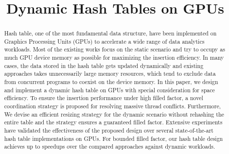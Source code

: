 \documentclass{vldb}
\begin{document}
\title{Dynamic Hash Tables on GPUs}




\maketitle

\begin{abstract}
Hash table, one of the most fundamental data structure,
have been implemented on Graphics Processing Units (GPUs) to accelerate a wide range of data analytics workloads. Most of the existing works focus on the static scenario and try to occupy as much GPU device memory as possible for maximizing the insertion efficiency. In many cases, the data stored in the hash table gets updated dynamically and existing approaches takes unnecessarily large memory resources, which tend to exclude data from concurrent programs to coexist on the device memory.
In this paper, we design and implement a dynamic hash table on GPUs with special consideration for space efficiency. To ensure the insertion performance under high filled factor, a novel coordination strategy is proposed for resolving massive thread conflicts. 
Furthermore,
We devise an efficient resizing strategy for the dynamic scenario without rehashing the entire table and the strategy ensures a guaranteed filled factor.
Extensive experiments have validated the effectiveness of the proposed design over several state-of-the-art hash table implementations on GPUs. For bounded filled factor, our hash table design achieves up to \xxx speedups over the compared approaches against dynamic workloads. 
\end{abstract}














\pagebreak


\balance
\end{document}
